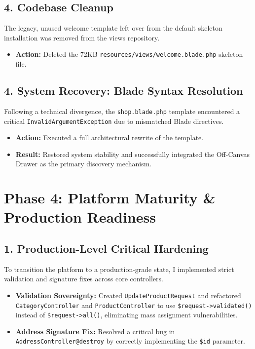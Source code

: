 \documentclass[12pt,a4paper]{article}
\begin{document}
\subsection{4. Codebase Cleanup}
The legacy, unused welcome template left over from the default skeleton installation was removed from the views repository.
\begin{itemize}
    \item \textbf{Action:} Deleted the 72KB \texttt{resources/views/welcome.blade.php} skeleton file.
\end{itemize}

\subsection{4. System Recovery: Blade Syntax Resolution}
Following a technical divergence, the \texttt{shop.blade.php} template encountered a critical \texttt{InvalidArgumentException} due to mismatched Blade directives.
\begin{itemize}
    \item \textbf{Action:} Executed a full architectural rewrite of the template.
    \item \textbf{Result:} Restored system stability and successfully integrated the Off-Canvas Drawer as the primary discovery mechanism.
\end{itemize}

\section{Phase 4: Platform Maturity \& Production Readiness}

\subsection{1. Production-Level Critical Hardening}
To transition the platform to a production-grade state, I implemented strict validation and signature fixes across core controllers.
\begin{itemize}
    \item \textbf{Validation Sovereignty:} Created \texttt{UpdateProductRequest} and refactored \texttt{CategoryController} and \texttt{ProductController} to use \texttt{\$request->validated()} instead of \texttt{\$request->all()}, eliminating mass assignment vulnerabilities.
    \item \textbf{Address Signature Fix:} Resolved a critical bug in \texttt{AddressController@destroy} by correctly implementing the \texttt{\$id} parameter.
\end{itemize}
\end{document}
